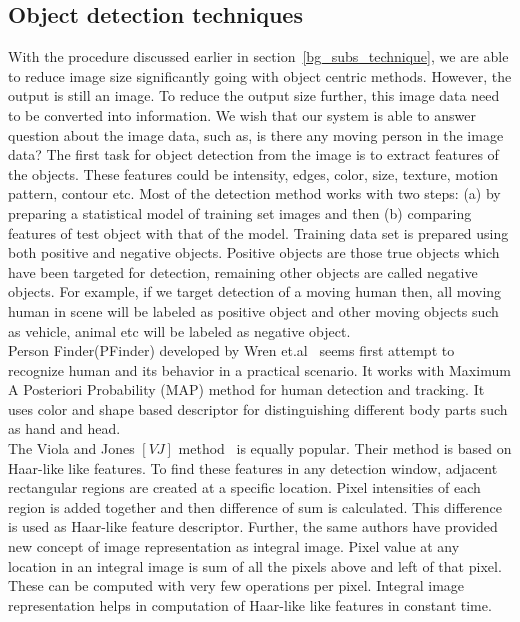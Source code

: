 \subsection{Object detection techniques}
\indent With the procedure discussed earlier in
section~\ref{bg_subs_technique}, we are able to reduce image size
significantly going with object centric methods. However, the output is
still an image. To reduce the output size further, this image data need
to be converted into information. We wish that our system is able to
answer question about the image data, such as, is there any moving
person in the image data? The first task for object detection from the
image is to extract features of the objects. These features could be
intensity, edges, color, size, texture, motion pattern, contour etc.
Most of the detection method works with two steps: (a) by preparing a
statistical model of training set images and then (b) comparing features
of test object with that of the model.  Training data set is prepared
using both positive and negative objects. Positive objects are those
true objects which have been targeted for detection, remaining other
objects are called negative objects. For example, if we target detection
of a moving human then, all moving human in scene will be labeled as
positive object and other moving objects such as vehicle, animal etc
will be labeled as negative object.\\
\indent Person Finder(PFinder) developed by Wren et.al~\cite{12} seems
first attempt to recognize human and its behavior in a practical
scenario. It works with Maximum A Posteriori Probability (MAP) method
for human detection and tracking. It uses color and shape based
descriptor for distinguishing different body parts such as hand and
head.\\
\indent The Viola and Jones $[VJ]$ method~\cite{16, 17} is equally
popular. Their method is based on Haar-like like features. To find these
features in any detection window, adjacent rectangular regions are
created at a specific location. Pixel intensities of each region is
added together and then difference of sum is calculated. This difference
is used as Haar-like feature descriptor. Further, the same authors have
provided new concept of image representation as integral image.  Pixel
value at any location in an integral image is sum of all the pixels
above and left of that pixel.  These can be computed with very few
operations per pixel.  Integral image representation helps in
computation of Haar-like like features in constant time.\\

